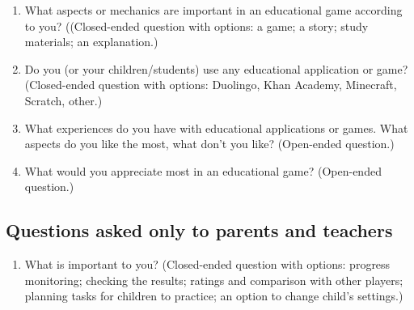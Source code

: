 \begin{enumerate}
    \item What aspects or mechanics are important in an educational game according to you? ((Closed-ended question with options: a game; a story; study materials; an explanation.)
    \item Do you (or your children/students) use any educational application or game? (Closed-ended question with options: Duolingo, Khan Academy, Minecraft, Scratch, other.)
    \item What experiences do you have with educational applications or games. What aspects do you like the most, what don't you like? (Open-ended question.)
    \item What would you appreciate most in an educational game? (Open-ended question.) 
\end{enumerate}

\subsection*{Questions asked only to parents and teachers}

\begin{enumerate}
    \item What is important to you? (Closed-ended question with options: progress monitoring; checking the results; ratings and comparison with other players; planning tasks for children to practice; an option to change child's settings.) 
\end{enumerate}
